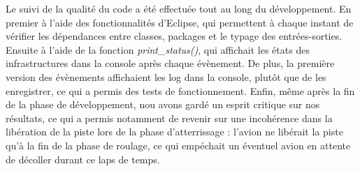 Le suivi de la qualité du code a été effectuée tout au long du développement. En premier à l'aide des fonctionnalités d'Eclipse, qui permettent à chaque instant de vérifier les dépendances entre classes, packages et le typage des entrées-sorties. Ensuite à l'aide de la fonction \textit{print_status()}, qui affichait les états des infrastructures dans la console après chaque évènement. De plus, la première version des évènements affichaient les log dans la console, plutôt que de les enregistrer, ce qui a permis des tests de fonctionnement.
Enfin, même après la fin de la phase de développement, nou avons gardé un esprit critique sur nos résultats, ce qui a permis notamment de revenir sur une incohérence dans la libération de la piste lors de la phase d'atterrissage : l'avion ne libérait la piste qu'à la fin de la phase de roulage, ce qui empéchait un éventuel avion en attente de décoller durant ce laps de temps.
